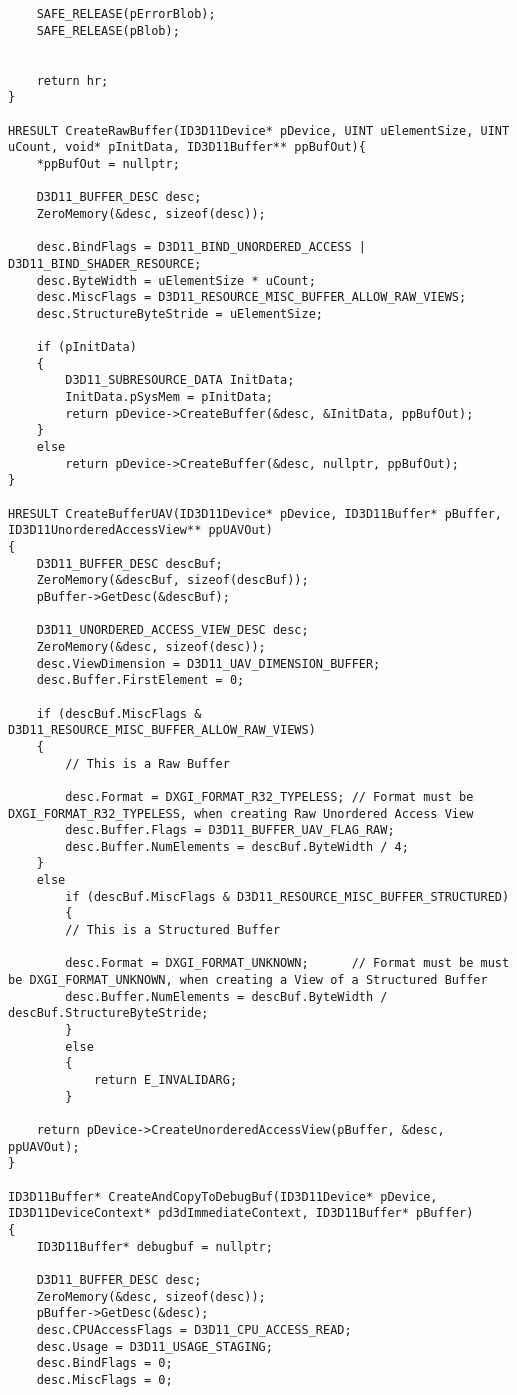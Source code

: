 \begin{lstlisting}
	SAFE_RELEASE(pErrorBlob);
	SAFE_RELEASE(pBlob);


	return hr;
}

HRESULT CreateRawBuffer(ID3D11Device* pDevice, UINT uElementSize, UINT uCount, void* pInitData, ID3D11Buffer** ppBufOut){
	*ppBufOut = nullptr;

	D3D11_BUFFER_DESC desc;
	ZeroMemory(&desc, sizeof(desc));

	desc.BindFlags = D3D11_BIND_UNORDERED_ACCESS | D3D11_BIND_SHADER_RESOURCE;
	desc.ByteWidth = uElementSize * uCount;
	desc.MiscFlags = D3D11_RESOURCE_MISC_BUFFER_ALLOW_RAW_VIEWS;
	desc.StructureByteStride = uElementSize;

	if (pInitData)
	{
		D3D11_SUBRESOURCE_DATA InitData;
		InitData.pSysMem = pInitData;
		return pDevice->CreateBuffer(&desc, &InitData, ppBufOut);
	}
	else
		return pDevice->CreateBuffer(&desc, nullptr, ppBufOut);
}

HRESULT CreateBufferUAV(ID3D11Device* pDevice, ID3D11Buffer* pBuffer, ID3D11UnorderedAccessView** ppUAVOut)
{
	D3D11_BUFFER_DESC descBuf;
	ZeroMemory(&descBuf, sizeof(descBuf));
	pBuffer->GetDesc(&descBuf);

	D3D11_UNORDERED_ACCESS_VIEW_DESC desc;
	ZeroMemory(&desc, sizeof(desc));
	desc.ViewDimension = D3D11_UAV_DIMENSION_BUFFER;
	desc.Buffer.FirstElement = 0;

	if (descBuf.MiscFlags & D3D11_RESOURCE_MISC_BUFFER_ALLOW_RAW_VIEWS)
	{
		// This is a Raw Buffer

		desc.Format = DXGI_FORMAT_R32_TYPELESS; // Format must be DXGI_FORMAT_R32_TYPELESS, when creating Raw Unordered Access View
		desc.Buffer.Flags = D3D11_BUFFER_UAV_FLAG_RAW;
		desc.Buffer.NumElements = descBuf.ByteWidth / 4;
	}
	else
		if (descBuf.MiscFlags & D3D11_RESOURCE_MISC_BUFFER_STRUCTURED)
		{
		// This is a Structured Buffer

		desc.Format = DXGI_FORMAT_UNKNOWN;      // Format must be must be DXGI_FORMAT_UNKNOWN, when creating a View of a Structured Buffer
		desc.Buffer.NumElements = descBuf.ByteWidth / descBuf.StructureByteStride;
		}
		else
		{
			return E_INVALIDARG;
		}

	return pDevice->CreateUnorderedAccessView(pBuffer, &desc, ppUAVOut);
}

ID3D11Buffer* CreateAndCopyToDebugBuf(ID3D11Device* pDevice, ID3D11DeviceContext* pd3dImmediateContext, ID3D11Buffer* pBuffer)
{
	ID3D11Buffer* debugbuf = nullptr;

	D3D11_BUFFER_DESC desc;
	ZeroMemory(&desc, sizeof(desc));
	pBuffer->GetDesc(&desc);
	desc.CPUAccessFlags = D3D11_CPU_ACCESS_READ;
	desc.Usage = D3D11_USAGE_STAGING;
	desc.BindFlags = 0;
	desc.MiscFlags = 0;




\end{lstlisting}
